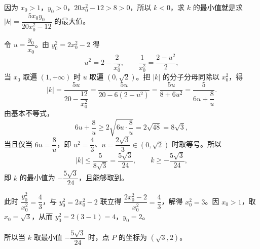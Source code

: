 \begin{problem}
\begin{solution}
因为 $x_0>1$，$y_0>0$，$20x_0^2-12>8>0$，所以 $k<0$，求 $k$ 的最小值就是求 $|k|=\dfrac{5x_0y_0}{20x_0^2-12}$ 的最大值。

令 $u=\dfrac{y_0}{x_0}$。由 $y_0^2=2x_0^2-2$ 得
\[
u^2=2-\frac{2}{x_0^2},\qquad \frac{1}{x_0^2}=\frac{2-u^2}{2},
\]
当 $x_0$ 取遍 $(1,+\infty)$ 时 $u$ 取遍 $(0,\sqrt{2})$。把 $|k|$ 的分子分母同除以 $x_0^2$，得
\[
|k|=\frac{5u}{20-\dfrac{12}{x_0^2}}=\frac{5u}{20-6\left(2-u^2\right)}=\frac{5u}{8+6u^2}=\frac{5}{6u+\dfrac{8}{u}} .
\]
由基本不等式，
\[
6u+\frac{8}{u}\geqslant 2\sqrt{6u\cdot\frac{8}{u}}=2\sqrt{48}=8\sqrt{3},
\]
当且仅当 $6u=\dfrac{8}{u}$，即 $u^2=\dfrac{4}{3}$、$u=\dfrac{2\sqrt{3}}{3}\in(0,\sqrt{2})$ 时取等号。所以
\[
|k|\leqslant\frac{5}{8\sqrt{3}}=\frac{5\sqrt{3}}{24},\qquad k\geqslant-\frac{5\sqrt{3}}{24},
\]
即 $k$ 的最小值为 $-\dfrac{5\sqrt{3}}{24}$，且能够取到。

此时 $\dfrac{y_0^2}{x_0^2}=\dfrac{4}{3}$，与 $y_0^2=2x_0^2-2$ 联立得 $\dfrac{2x_0^2-2}{x_0^2}=\dfrac{4}{3}$，解得 $x_0^2=3$。因 $x_0>1$，取 $x_0=\sqrt{3}$，从而 $y_0^2=2(3-1)=4$，$y_0=2$。

所以当 $k$ 取最小值 $-\dfrac{5\sqrt{3}}{24}$ 时，点 $P$ 的坐标为 $(\sqrt{3},2)$。
\end{solution}
\end{problem}

